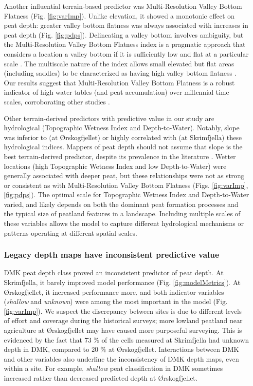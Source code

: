 \documentclass[soil, manuscript]{copernicus}
\begin{document}
Another influential terrain-based predictor was Multi-Resolution Valley Bottom Flatness (Fig. \ref{fig:varImp}).
Unlike elevation, it showed a monotonic effect on peat depth: greater valley bottom flatness was always associated with increases in peat depth (Fig. \ref{fig:pdps}).
Delineating a valley bottom involves ambiguity, but the Multi-Resolution Valley Bottom Flatness index is a pragmatic approach that considers a location a valley bottom if it is sufficiently low and flat at a particular scale \citep{gallantMultiresolutionIndexValley2003}.
The multiscale nature of the index allows small elevated but flat areas (including saddles) to be characterized as having high valley bottom flatness \citep{gallantMultiresolutionIndexValley2003}.
Our results suggest that Multi-Resolution Valley Bottom Flatness is a robust indicator of high water tables (and peat accumulation) over millennial time scales, corroborating other studies \citep{rudiyantoOpenDigitalMapping2018, deragonMappingMaximumPeat2023}.

Other terrain-derived predictors with predictive value in our study are hydrological (Topographic Wetness Index and Depth-to-Water).
Notably, slope was inferior to (at Ørskogfjellet) or highly correlated with (at Skrimfjella) these hydrological indices.
Mappers of peat depth should not assume that slope is the best terrain-derived predictor, despite its prevalence in the literature \citep{pohjankukkaDigitalMappingPeat2025}.
Wetter locations (high Topographic Wetness Index and low Depth-to-Water) were generally associated with deeper peat, but these relationships were not as strong or consistent as with Multi-Resolution Valley Bottom Flatness (Figs. \ref{fig:varImp}, \ref{fig:pdps}).
The optimal scale for Topographic Wetness Index and Depth-to-Water varied, and likely depends on both the dominant peat formation processes and the typical size of peatland features in a landscape.
Including multiple scales of these variables allows the model to capture different hydrological mechanisms or patterns operating at different spatial scales.

\subsubsection{Legacy depth maps have inconsistent predictive value}

DMK peat depth class proved an inconsistent predictor of peat depth.
At Skrimfjella, it barely improved model performance (Fig. \ref{fig:modelMetrics}).
At Ørskogfjellet, it increased performance more, and both indicator variables (\emph{shallow} and \emph{unknown}) were among the most important in the model (Fig. \ref{fig:varImp}).
We suspect the discrepancy between sites is due to different levels of effort and coverage during the historical surveys; more lowland peatland near agriculture at Ørskogfjellet may have caused more purposeful surveying.
This is evidenced by the fact that 73 \% of the cells measured at Skrimfjella had unknown depth in DMK, compared to 20 \% at Ørskogfjellet.
Interactions between DMK and other variables also underline the inconsistency of DMK depth maps, even within a site.
For example, \emph{shallow} peat classification in DMK sometimes increased rather than decreased predicted depth at Ørskogfjellet.
\end{document}
